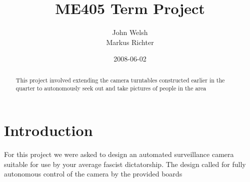 \documentclass[]{article}
\title{ME405 Term Project}
\author{John Welsh \\
Markus Richter}
\date{2008-06-02}
\begin{document}
\ifpdf
{}
\else
{}
\fi

\begin{titlepage}
\maketitle
\end{titlepage}


\begin{abstract}
	This project involved extending the camera turntables constructed earlier in the
	quarter to autonomously seek out and take pictures of people in the area 
\end{abstract}

\section{Introduction}
	For this project we were asked to design an automated surveillance camera
	suitable for use by your average fascist dictatorship. The design called
	for fully autonomous control of the camera by the provided boards



\end{document}
